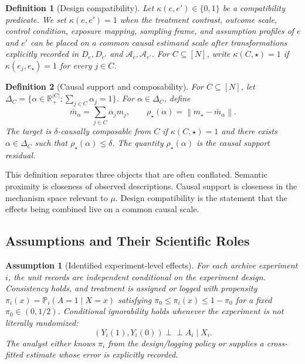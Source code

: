 \documentclass[11pt]{article}
\numberwithin{equation}{section}
\newtheorem{assumption}{Assumption}[section]
\newtheorem{definition}{Definition}[section]
\newcommand{\Pbb}{\mathbb P}
\newcommand{\R}{\mathbb R}
\newcommand{\1}{\mathbf 1}
\newcommand{\cA}{\mathcal A}
\newcommand{\norm}[1]{\left\lVert #1\right\rVert}
\newcommand{\ind}{\perp\!\!\!\perp}
\begin{document}
\begin{definition}[Design compatibility]
Let \(\kappa(e,e')\in\{0,1\}\) be a compatibility predicate.  We set \(\kappa(e,e')=1\) when the treatment contrast, outcome scale, control condition, exposure mapping, sampling frame, and assumption profiles of \(e\) and \(e'\) can be placed on a common causal estimand scale after transformations explicitly recorded in \(D_e,D_{e'}\) and \(\cA_e,\cA_{e'}\).  For \(C\subseteq[N]\), write \(\kappa(C,\star)=1\) if \(\kappa(e_j,e_\star)=1\) for every \(j\in C\).
\end{definition}

\begin{definition}[Causal support and composability]
\label{def:composable}
For \(C\subseteq[N]\), let \(\Delta_C=\{\alpha\in\R_+^{|C|}:\sum_{j\in C}\alpha_j=1\}\).  For \(\alpha\in\Delta_C\), define
\[
  \bar m_\alpha=\sum_{j\in C}\alpha_jm_j,
  \qquad
  \rho_\star(\alpha)=\norm{m_\star-\bar m_\alpha}.
\]
The target is \(\delta\)-causally composable from \(C\) if \(\kappa(C,\star)=1\) and there exists \(\alpha\in\Delta_C\) such that \(\rho_\star(\alpha)\le\delta\).  The quantity \(\rho_\star(\alpha)\) is the causal support residual.
\end{definition}

This definition separates three objects that are often conflated.  Semantic proximity is closeness of observed descriptions.  Causal support is closeness in the mechanism space relevant to \(\mu\).  Design compatibility is the statement that the effects being combined live on a common causal scale.

\subsection{Assumptions and Their Scientific Roles}

\begin{assumption}[Identified experiment-level effects]
\label{ass:identified}
For each archive experiment \(i\), the unit records are independent conditional on the experiment design.  Consistency holds, and treatment is assigned or logged with propensity \(\pi_i(x)=\Pbb_i(A=1\mid X=x)\) satisfying \(\pi_0\le\pi_i(x)\le1-\pi_0\) for a fixed \(\pi_0\in(0,1/2)\).  Conditional ignorability holds whenever the experiment is not literally randomized:
\[
  (Y_i(1),Y_i(0))\ind A_i\mid X_i.
\]
The analyst either knows \(\pi_i\) from the design/logging policy or supplies a cross-fitted estimate whose error is explicitly recorded.
\end{assumption}
\end{document}
